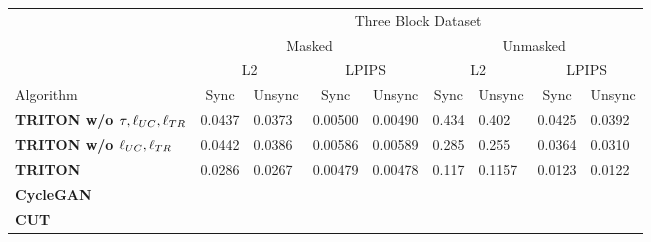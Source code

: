 \documentclass{article}
\begin{document}
\begin{table}[H]
	\begin{tabular}{l|llllllll}
		& \multicolumn{8}{c}{Three Block Dataset}                                                                                                                                                                                              \\
		& \multicolumn{4}{c|}{Masked}                                                                                       & \multicolumn{4}{c}{Unmasked}                                                                                     \\
		& \multicolumn{2}{c|}{L2}                                 & \multicolumn{2}{c|}{LPIPS}                              & \multicolumn{2}{c|}{L2}                                 & \multicolumn{2}{c}{LPIPS}                              \\
		Algorithm                              & \multicolumn{1}{c|}{Sync} & \multicolumn{1}{c|}{Unsync} & \multicolumn{1}{c|}{Sync} & \multicolumn{1}{c|}{Unsync} & \multicolumn{1}{c|}{Sync} & \multicolumn{1}{c|}{Unsync} & \multicolumn{1}{c|}{Sync} & \multicolumn{1}{c}{Unsync} \\ \hline
		\textbf{TRITON w/o $\tau, \ell_{UC}, \ell_{TR}$} & 0.0437                    & 0.0373                      & 0.00500                   & 0.00490                     & 0.434                     & 0.402                       & 0.0425                    & 0.0392                     \\
		\textbf{TRITON w/o $\ell_{UC}, \ell_{TR}$}       & 0.0442                    & 0.0386                      & 0.00586                   & 0.00589                     & 0.285                     & 0.255                       & 0.0364                    & 0.0310                     \\
		\textbf{TRITON}                        & 0.0286                    & 0.0267                      & 0.00479                   & 0.00478                     & 0.117                     & 0.1157                      & 0.0123                    & 0.0122                     \\
		\textbf{CycleGAN}                      &                           &                             &                           &                             &                           &                             &                           &                            \\
		\textbf{CUT}                           &                           &                             &                           &                             &                           &                             &                           &                           
	\end{tabular}
\end{table}
\end{document}

